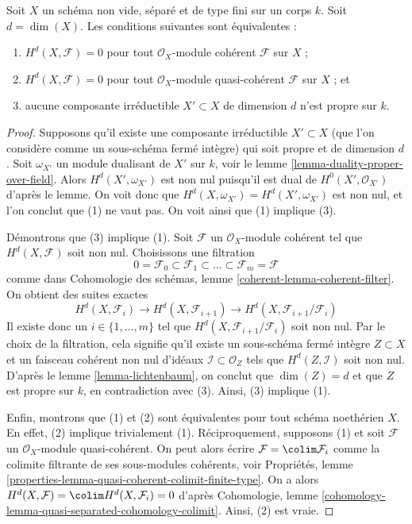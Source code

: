 \begin{theorem}
\label{theorem-lichtenbaum}
Soit $X$ un schéma non vide, séparé et de type fini sur un corps $k$. Soit $d = \dim(X)$. Les conditions suivantes sont équivalentes :
\begin{enumerate}
\item $H^d(X, \mathcal{F}) = 0$ pour tout $\mathcal{O}_X$-module cohérent $\mathcal{F}$ sur $X$ ;
\item $H^d(X, \mathcal{F}) = 0$ pour tout $\mathcal{O}_X$-module quasi-cohérent $\mathcal{F}$ sur $X$ ; et
\item aucune composante irréductible $X' \subset X$ de dimension $d$ n'est propre sur $k$.
\end{enumerate}
\end{theorem}

\begin{proof}
Supposons qu'il existe une composante irréductible $X' \subset X$ (que l'on considère comme un sous-schéma fermé intègre) qui soit propre et de dimension $d$. Soit $\omega_{X'}$ un module dualisant de $X'$ sur $k$, voir le lemme \ref{lemma-duality-proper-over-field}. Alors $H^d(X', \omega_{X'})$ est non nul puisqu'il est dual de $H^0(X', \mathcal{O}_{X'})$ d'après le lemme. On voit donc que $H^d(X, \omega_{X'}) = H^d(X', \omega_{X'})$ est non nul, et l'on conclut que (1) ne vaut pas. On voit ainsi que (1) implique (3).

\medskip\noindent
Démontrons que (3) implique (1). Soit $\mathcal{F}$ un $\mathcal{O}_X$-module cohérent tel que $H^d(X, \mathcal{F})$ soit non nul. Choisissons une filtration
$$
0 = \mathcal{F}_0 \subset \mathcal{F}_1 \subset
\ldots \subset \mathcal{F}_m = \mathcal{F}
$$
comme dans Cohomologie des schémas, lemme \ref{coherent-lemma-coherent-filter}. On obtient des suites exactes
$$
H^d(X, \mathcal{F}_i) \to H^d(X, \mathcal{F}_{i + 1}) \to
H^d(X, \mathcal{F}_{i + 1}/\mathcal{F}_i)
$$
Il existe donc un $i \in \{1, \ldots, m\}$ tel que $H^d(X, \mathcal{F}_{i + 1}/\mathcal{F}_i)$ soit non nul. Par le choix de la filtration, cela signifie qu'il existe un sous-schéma fermé intègre $Z \subset X$ et un faisceau cohérent non nul d'idéaux $\mathcal{I} \subset \mathcal{O}_Z$ tels que $H^d(Z, \mathcal{I})$ soit non nul. D'après le lemme \ref{lemma-lichtenbaum}, on conclut que $\dim(Z) = d$ et que $Z$ est propre sur $k$, en contradiction avec (3). Ainsi, (3) implique (1).

\medskip\noindent
Enfin, montrons que (1) et (2) sont équivalentes pour tout schéma noethérien $X$. En effet, (2) implique trivialement (1). Réciproquement, supposons (1) et soit $\mathcal{F}$ un $\mathcal{O}_X$-module quasi-cohérent. On peut alors écrire $\mathcal{F} = \colim \mathcal{F}_i$ comme la colimite filtrante de ses sous-modules cohérents, voir Propriétés, lemme \ref{properties-lemma-quasi-coherent-colimit-finite-type}. On a alors $H^d(X, \mathcal{F}) = \colim H^d(X, \mathcal{F}_i) = 0$ d'après Cohomologie, lemme \ref{cohomology-lemma-quasi-separated-cohomology-colimit}. Ainsi, (2) est vraie.
\end{proof}












